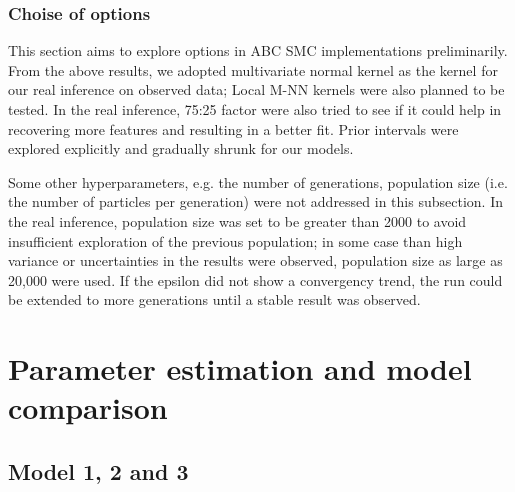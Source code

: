 

\subsubsection{Choise of options} 

This section aims to explore options in ABC SMC implementations preliminarily. From the above results, we adopted multivariate normal kernel as the kernel for our real inference on observed data; Local M-NN kernels were also planned to be tested. In the real inference, 75:25 factor were also tried to see if it could help in recovering more features and resulting in a better fit. Prior intervals were explored explicitly and gradually shrunk for our models.


Some other hyperparameters, e.g. the number of generations, population size (i.e. the number of particles per generation) were not addressed in this subsection. In the real inference, population size was set to be greater than 2000 to avoid insufficient exploration of the previous population; in some case than high variance or uncertainties in the results were observed, population size as large as 20,000 were used. If the epsilon did not show a convergency trend, the run could be extended to more generations until a stable result was observed.









\section{Parameter estimation and model comparison}

\subsection{Model 1, 2 and 3}


